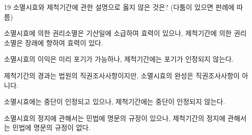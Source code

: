 \begin{question}{19}
소멸시효와 제척기간에 관한 설명으로 옳지 않은 것은? (다툼이 있으면 판례에 따름)
\begin{choices}
  \item 소멸시효에 의한 권리소멸은 기산일에 소급하여 효력이 있으나, 제척기간에 의한 권리소멸은 장래에 향하여 효력이 있다.
  \item 소멸시효의 이익은 미리 포기가 가능하나, 제척기간에는 포기가 인정되지 않는다.
  \item 제척기간의 경과는 법원의 직권조사사항이지만, 소멸시효의 완성은 직권조사사항이 아니다.
  \item 소멸시효에는 중단이 인정되고 있으나, 제척기간에는 중단이 인정되지 않는다.
  \item 소멸시효의 정지에 관해서는 민법에 명문의 규정이 있으나, 제척기간의 정지에 관해서는 민법에 명문의 규정이 없다.
\end{choices}
\end{question}
